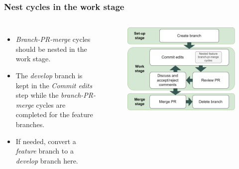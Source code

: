 \documentclass[aspectratio=169]{beamer}
\begin{document}
\begin{frame}
	\frametitle{Nest cycles in the work stage}
	\begin{columns}[c]
		
		\begin{itemize}
			\setlength\itemsep{1em}
			\item \textit{Branch-PR-merge} cycles should be nested
			in the work stage.
			\item The \textit{develop} branch is kept
			in the \textit{Commit edits} step while
			the \textit{branch-PR-merge} cycles are completed
			for the feature branches.
			\item If needed, convert a \textit{feature} branch
			to a \textit{develop} branch here.
		\end{itemize}
		
		\vspace{-.75cm}
		\begin{figure}
			\centering
			\includegraphics[width=\textwidth]{./img/nested-branch-pr-merge-cycle.png}
		\end{figure}
	\end{columns}
\end{frame}
\end{document}
